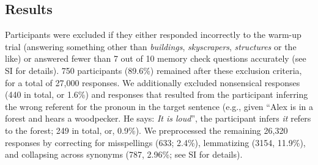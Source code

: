 \documentclass[doc, floatsintext]{apa6}
\begin{document}
\subsection{Results}

Participants were excluded if they either responded incorrectly to the warm-up trial (answering something other than \emph{buildings}, \emph{skyscrapers}, \emph{structures} or the like) or answered fewer than 7 out of 10 memory check questions accurately (see SI for details).
750 participants (89.6\%) remained after these exclusion criteria, for a total of 27,000 responses.
We additionally excluded nonsensical responses (440 in total, or 1.6\%)  and responses that resulted from the participant inferring the wrong referent for the pronoun in the target sentence (e.g., given ``Alex is in a forest and hears a woodpecker. He says: \emph{It is loud}'', the participant infers \emph{it} refers to the forest; 249 in total, or, 0.9\%).
We preprocessed the remaining 26,320 responses by correcting for misspellings  (633; 2.4\%), lemmatizing (3154, 11.9\%), and collapsing across synonyms (787, 2.96\%; see SI for details).


\end{document}
